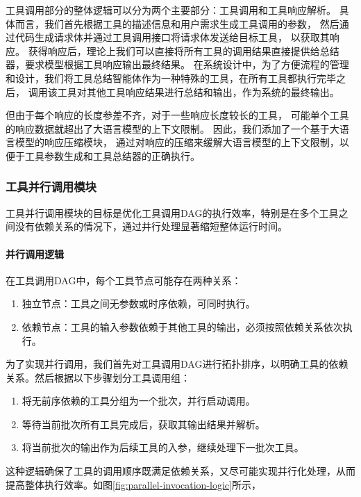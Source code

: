 工具调用部分的整体逻辑可以分为两个主要部分：工具调用和工具响应解析。
具体而言，我们首先根据工具的描述信息和用户需求生成工具调用的参数，
然后通过代码生成请求体并通过工具调用接口将请求体发送给目标工具，
以获取其响应。
获得响应后，理论上我们可以直接将所有工具的调用结果直接提供给总结器，要求模型根据工具响应输出最终结果。
在系统设计中，为了方便流程的管理和设计，我们将工具总结智能体作为一种特殊的工具，在所有工具都执行完毕之后，
调用该工具对其他工具响应结果进行总结和输出，作为系统的最终输出。

但由于每个响应的长度参差不齐，对于一些响应长度较长的工具，
可能单个工具的响应数据就超出了大语言模型的上下文限制。
因此，我们添加了一个基于大语言模型的响应压缩模块，
通过对响应的压缩来缓解大语言模型的上下文限制，以便于工具参数生成和工具总结器的正确执行。

\subsubsection{工具并行调用模块}

工具并行调用模块的目标是优化工具调用DAG的执行效率，特别是在多个工具之间没有依赖关系的情况下，通过并行处理显著缩短整体运行时间。

\paragraph{并行调用逻辑}

在工具调用DAG中，每个工具节点可能存在两种关系：
\begin{enumerate}
    \item 独立节点：工具之间无参数或时序依赖，可同时执行。
    \item 依赖节点：工具的输入参数依赖于其他工具的输出，必须按照依赖关系依次执行。
\end{enumerate}

为了实现并行调用，我们首先对工具调用DAG进行拓扑排序，以明确工具的依赖关系。然后根据以下步骤划分工具调用组：
\begin{enumerate}
    \item 将无前序依赖的工具分组为一个批次，并行启动调用。
    \item 等待当前批次所有工具完成后，获取其输出结果并解析。
    \item 将当前批次的输出作为后续工具的入参，继续处理下一批次工具。
\end{enumerate}

这种逻辑确保了工具的调用顺序既满足依赖关系，又尽可能实现并行化处理，从而提高整体执行效率。如图\ref{fig:parallel-invocation-logic}所示，

